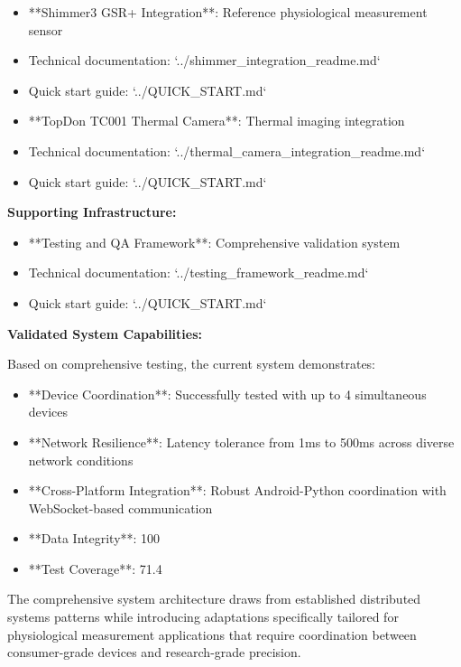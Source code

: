 \documentclass[12pt,a4paper]{article}
\begin{document}
\begin{itemize}
\item **Shimmer3 GSR+ Integration**: Reference physiological measurement sensor
\item Technical documentation: `../shimmer_integration_readme.md`
\item Quick start guide: `../QUICK_START.md`

\item **TopDon TC001 Thermal Camera**: Thermal imaging integration
\item Technical documentation: `../thermal_camera_integration_readme.md`
\item Quick start guide: `../QUICK_START.md`

\end{itemize}
\textbf{Supporting Infrastructure:}

\begin{itemize}
\item **Testing and QA Framework**: Comprehensive validation system
\item Technical documentation: `../testing_framework_readme.md`
\item Quick start guide: `../QUICK_START.md`

\end{itemize}
\textbf{Validated System Capabilities:}

Based on comprehensive testing, the current system demonstrates:

\begin{itemize}
\item **Device Coordination**: Successfully tested with up to 4 simultaneous devices
\item **Network Resilience**: Latency tolerance from 1ms to 500ms across diverse network conditions
\item **Cross-Platform Integration**: Robust Android-Python coordination with WebSocket-based communication
\item **Data Integrity**: 100%
\item **Test Coverage**: 71.4%

\end{itemize}
The comprehensive system architecture draws from established distributed systems patterns while introducing adaptations
specifically tailored for physiological measurement applications that require coordination between consumer-grade
devices and research-grade precision.
\end{document}
